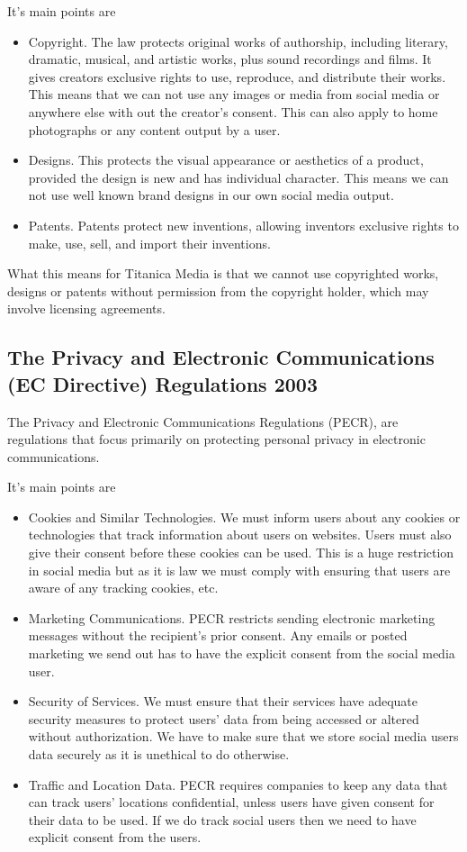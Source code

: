 \documentclass{article}
\begin{document}
It's main points are
\begin{itemize}
    \item Copyright. The law protects original works of authorship, including literary, dramatic, musical, and artistic works, plus sound recordings and films. It gives creators exclusive rights to use, reproduce, and distribute their works. This means that we can not use any images or media from social media or anywhere else with out the creator's consent. This can also apply to home photographs or any content output by a user.
    \item Designs. This protects the visual appearance or aesthetics of a product, provided the design is new and has individual character. This means we can not use well known brand designs in our own social media output.
    \item Patents. Patents protect new inventions, allowing inventors exclusive rights to make, use, sell, and import their inventions.

\end{itemize}

What this means for Titanica Media is that we cannot use copyrighted works, designs or patents without permission from the copyright holder, which may involve licensing agreements.


\subsection{The Privacy and Electronic Communications (EC Directive) Regulations 2003}

The Privacy and Electronic Communications Regulations (PECR), are regulations that focus primarily on protecting personal privacy in electronic communications.

It's main points are
\begin{itemize}
    \item Cookies and Similar Technologies. We must inform users about any cookies or  technologies that track information about users on websites. Users must also give their consent before these cookies can be used. This is a huge restriction in social media but as it is law we must comply with ensuring that users are aware of any tracking cookies, etc.
    \item Marketing Communications. PECR restricts sending electronic marketing messages without the recipient's prior consent. Any emails or posted marketing we send out has to have the explicit consent from the social media user.
    \item Security of Services. We must ensure that their services have adequate security measures to protect users' data from being accessed or altered without authorization. We have to make sure that we store social media users data securely as it is unethical to do otherwise.
    \item Traffic and Location Data. PECR requires companies to keep any data that can track users' locations confidential, unless users have given consent for their data to be used. If we do track social users then we need to have explicit consent from the users. 
\end{itemize}
\end{document}
